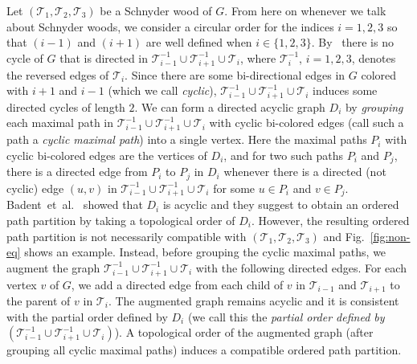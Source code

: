 \documentclass{article}
\newcommand{\TT}{{\mathcal{T}}}
\newcommand{\df}{\textit}
\begin{document}
Let $(\TT_1, \TT_2, \TT_3)$ be a Schnyder wood of $G$. From here on whenever
we talk about Schnyder woods, we consider a circular order for the indices $i=1,2,3$ so that
$(i-1)$ and $(i+1)$ are well defined when $i\in \{1,2,3\}$. By~\cite{FZ08}
there is no cycle of $G$ that is directed in $\TT_{i-1}^{-1}\cup \TT_{i+1}^{-1}\cup \TT_{i}$, where
$\TT_i^{-1}$, $i=1,2,3$, denotes the reversed edges of $\TT_i$.
Since there are some bi-directional edges in $G$ colored
with $i+1$ and $i-1$ (which we call \df{cyclic}), $\TT_{i-1}^{-1}\cup \TT_{i+1}^{-1}\cup \TT_{i}$ induces some directed cycles of length $2$. We can form a directed acyclic graph $D_i$ by \textit{grouping}
each maximal path in $\TT_{i-1}^{-1}\cup \TT_{i+1}^{-1}\cup \TT_{i}$ with cyclic bi-colored edges
(call such a path a \textit{cyclic maximal path}) into a single vertex. Here the maximal paths $P_i$ with
cyclic bi-colored edges are the vertices of $D_i$, and for
two such paths $P_i$ and $P_j$, there is a directed edge from $P_i$ to $P_j$ in $D_i$ whenever
there is a directed (not cyclic) edge $(u,v)$ in $\TT_{i-1}^{-1}\cup \TT_{i+1}^{-1}\cup \TT_{i}$
for some $u\in P_i$ and $v\in P_j$.
Badent~et~al.~\cite{BBC11} showed that $D_i$ is acyclic and they suggest
to obtain an ordered path partition by taking a topological order of $D_i$.
However, the resulting ordered path partition is not necessarily compatible with $(\TT_1, \TT_2, \TT_3)$ and Fig.~\ref{fig:non-eq} shows an example.
Instead, before grouping the cyclic maximal paths, we augment the graph
$\TT_{i-1}^{-1}\cup \TT_{i+1}^{-1}\cup \TT_{i}$ with the following directed edges.
For each vertex $v$ of $G$, we add a directed edge from each child of $v$ in $\TT_{i-1}$
and $\TT_{i+1}$ to the parent of $v$ in $\TT_i$. The augmented graph remains acyclic
and it is consistent with the partial order defined by $D_i$ (we call this the \textit{partial order defined by
$(\TT_{i-1}^{-1}\cup \TT_{i+1}^{-1}\cup \TT_{i})$}).
A topological order of the augmented graph (after grouping all cyclic maximal paths)
induces a compatible ordered path partition.
\end{document}
